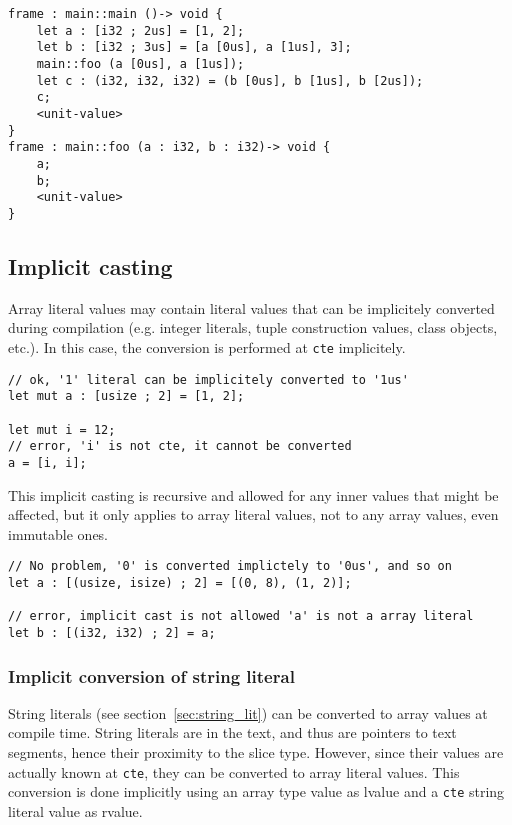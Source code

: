 \begin{lstlisting}[style=intermediateVerb]
frame : main::main ()-> void {
    let a : [i32 ; 2us] = [1, 2];
    let b : [i32 ; 3us] = [a [0us], a [1us], 3];
    main::foo (a [0us], a [1us]);
    let c : (i32, i32, i32) = (b [0us], b [1us], b [2us]);
    c;
    <unit-value>
}
frame : main::foo (a : i32, b : i32)-> void {
    a;
    b;
    <unit-value>
}
\end{lstlisting}


\subsection{Implicit casting}

Array literal values may contain literal values that can be implicitely
converted during compilation (e.g. integer literals, tuple construction values,
class objects, etc.). In this case, the conversion is performed at \texttt{cte}
implicitely.

\begin{lstlisting}[style=coloredverbatim]
// ok, '1' literal can be implicitely converted to '1us'
let mut a : [usize ; 2] = [1, 2];

let mut i = 12;
// error, 'i' is not cte, it cannot be converted
a = [i, i];
\end{lstlisting}

This implicit casting is recursive and allowed for any inner values that might
be affected, but it only applies to array literal values, not to any array
values, even immutable ones.

\begin{lstlisting}[style=coloredverbatim]
// No problem, '0' is converted implictely to '0us', and so on
let a : [(usize, isize) ; 2] = [(0, 8), (1, 2)];

// error, implicit cast is not allowed 'a' is not a array literal
let b : [(i32, i32) ; 2] = a;
\end{lstlisting}

\subsubsection{Implicit conversion of string literal}

String literals (see section~\ref{sec:string_lit}) can be converted to array
values at compile time. String literals are in the text, and thus are pointers to
text segments, hence their proximity to the slice type. However, since their
values are actually known at \texttt{cte}, they can be converted to array
literal values. This conversion is done implicitly using an array type value as
lvalue and a \texttt{cte} string literal value as rvalue.


